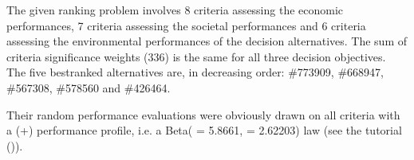 \documentclass[a4paper,12pt,english]{sphinxhowto}
\begin{document}
\begin{sphinxVerbatim}[commandchars=\\\{\},numbers=left,firstnumber=1,stepnumber=1]
\end{sphinxVerbatim}

The given ranking problem involves 8 criteria assessing the economic performances, 7 criteria assessing the societal performances and 6 criteria assessing the environmental performances of the decision alternatives. The sum of criteria significance weights (336) is the same for all three decision objectives. The five best\sphinxhyphen{}ranked alternatives are, in decreasing order: \#773909, \#668947, \#567308, \#578560 and \#426464.

Their random performance evaluations were obviously drawn on all criteria with a  (+) performance profile, i.e. a Beta( = 5.8661,  = 2.62203) law (see the tutorial {\hyperref[\detokenize{tutorial:randomperformancetableau-tutorial-label}]{}} ()).
\end{document}
